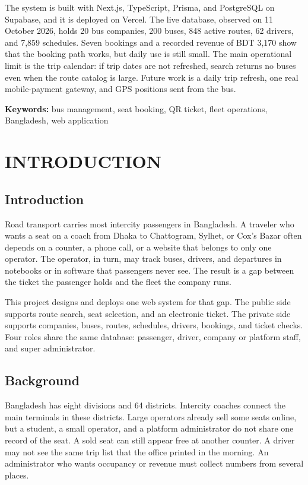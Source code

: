 \documentclass[12pt,a4paper]{report}
\begin{document}
The system is built with Next.js, TypeScript, Prisma, and PostgreSQL on Supabase, and it is deployed on Vercel. The live database, observed on 11 October 2026, holds 20 bus companies, 200 buses, 848 active routes, 62 drivers, and 7,859 schedules. Seven bookings and a recorded revenue of BDT 3,170 show that the booking path works, but daily use is still small. The main operational limit is the trip calendar: if trip dates are not refreshed, search returns no buses even when the route catalog is large. Future work is a daily trip refresh, one real mobile-payment gateway, and GPS positions sent from the bus.

\vspace{0.6em}
\noindent\textbf{Keywords:} bus management, seat booking, QR ticket, fleet operations, Bangladesh, web application

\tableofcontents
\listoffigures
\listoftables

\chapter{INTRODUCTION}
\label{ch:intro}

\section{Introduction}
Road transport carries most intercity passengers in Bangladesh. A traveler who wants a seat on a coach from Dhaka to Chattogram, Sylhet, or Cox's Bazar often depends on a counter, a phone call, or a website that belongs to only one operator. The operator, in turn, may track buses, drivers, and departures in notebooks or in software that passengers never see. The result is a gap between the ticket the passenger holds and the fleet the company runs.

This project designs and deploys one web system for that gap. The public side supports route search, seat selection, and an electronic ticket. The private side supports companies, buses, routes, schedules, drivers, bookings, and ticket checks. Four roles share the same database: passenger, driver, company or platform staff, and super administrator.

\section{Background}
Bangladesh has eight divisions and 64 districts. Intercity coaches connect the main terminals in these districts. Large operators already sell some seats online, but a student, a small operator, and a platform administrator do not share one record of the seat. A sold seat can still appear free at another counter. A driver may not see the same trip list that the office printed in the morning. An administrator who wants occupancy or revenue must collect numbers from several places.
\end{document}
